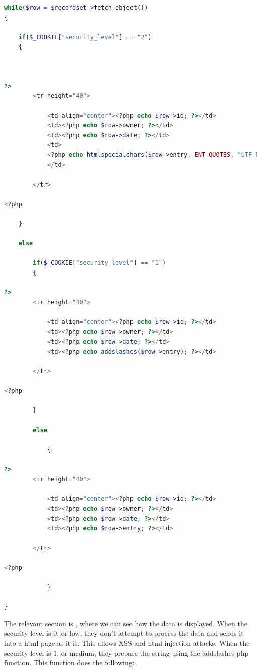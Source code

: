 \documentclass{article}
\begin{document}
\begin{lstlisting}[language=php, caption={XSS Code},label=php:xss-attack]
while($row = $recordset->fetch_object())
{

    if($_COOKIE["security_level"] == "2")
    {



?>
        <tr height="40">

            <td align="center"><?php echo $row->id; ?></td>
            <td><?php echo $row->owner; ?></td>
            <td><?php echo $row->date; ?></td>
            <td>
            <?php echo htmlspecialchars($row->entry, ENT_QUOTES, "UTF-8"); ?>
            </td>

        </tr>

<?php

    }

    else
        
        if($_COOKIE["security_level"] == "1")
        {

?>
        <tr height="40">

            <td align="center"><?php echo $row->id; ?></td>
            <td><?php echo $row->owner; ?></td>
            <td><?php echo $row->date; ?></td>
            <td><?php echo addslashes($row->entry); ?></td>

        </tr>

<?php

        }
        
        else        

            {

?>
        <tr height="40">

            <td align="center"><?php echo $row->id; ?></td>
            <td><?php echo $row->owner; ?></td>
            <td><?php echo $row->date; ?></td>
            <td><?php echo $row->entry; ?></td>

        </tr>

<?php          

            }

}
\end{lstlisting}

The relevant section is \label{php:xss-attack}, where we can see how the data is displayed.
When the security level is 0, or low, they don't attempt to process the data and sends it into a html page as it is. This allows XSS and html injection attacks.
When the security level is 1, or medium, they prepare the string using the addslashes php function.
This function does the following:
\end{document}
